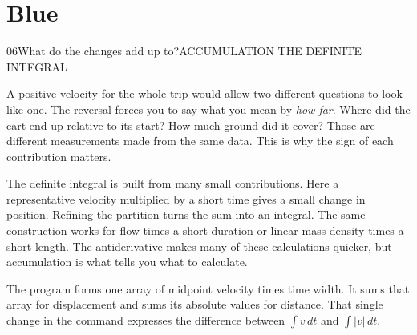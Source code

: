 \chapter{Blue}{06}{What do the changes add up to?}{ACCUMULATION \quad THE DEFINITE INTEGRAL}

A positive velocity for the whole trip would allow two different questions to look like one. The reversal forces you to say what you mean by \emph{how far}. Where did the cart end up relative to its start? How much ground did it cover? Those are different measurements made from the same data. This is why the sign of each contribution matters.

The definite integral is built from many small contributions. Here a representative velocity multiplied by a short time gives a small change in position. Refining the partition turns the sum into an integral. The same construction works for flow times a short duration or linear mass density times a short length. The antiderivative makes many of these calculations quicker, but accumulation is what tells you what to calculate.

The program forms one array of midpoint velocity times time width. It sums that array for displacement and sums its absolute values for distance. That single change in the command expresses the difference between \(\int v\,dt\) and \(\int |v|\,dt\).

